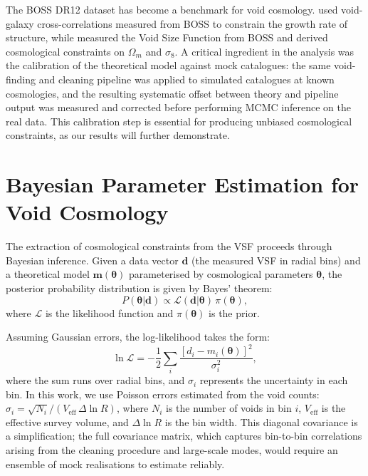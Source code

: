 \documentclass[12pt]{report}
\begin{document}
The BOSS DR12 dataset has become a benchmark for void cosmology. \citet{Hamaus2020} used void-galaxy cross-correlations measured from BOSS to constrain the growth rate of structure, while \citet{Contarini2023} measured the Void Size Function from BOSS and derived cosmological constraints on $\Omega_m$ and $\sigma_8$. A critical ingredient in the \citeauthor{Contarini2023} analysis was the calibration of the theoretical model against mock catalogues: the same void-finding and cleaning pipeline was applied to simulated catalogues at known cosmologies, and the resulting systematic offset between theory and pipeline output was measured and corrected before performing MCMC inference on the real data. This calibration step is essential for producing unbiased cosmological constraints, as our results will further demonstrate.


\section{Bayesian Parameter Estimation for Void Cosmology}
\label{sec:bayesian_background}

The extraction of cosmological constraints from the VSF proceeds through Bayesian inference. Given a data vector $\mathbf{d}$ (the measured VSF in radial bins) and a theoretical model $\mathbf{m}(\boldsymbol{\theta})$ parameterised by cosmological parameters $\boldsymbol{\theta}$, the posterior probability distribution is given by Bayes' theorem:
\begin{equation}
    P(\boldsymbol{\theta}|\mathbf{d}) \propto \mathcal{L}(\mathbf{d}|\boldsymbol{\theta})\,\pi(\boldsymbol{\theta})
    \label{eq:bayes},
\end{equation}
where $\mathcal{L}$ is the likelihood function and $\pi(\boldsymbol{\theta})$ is the prior.

Assuming Gaussian errors, the log-likelihood takes the form:
\begin{equation}
    \ln\mathcal{L} = -\frac{1}{2}\sum_i \frac{[d_i - m_i(\boldsymbol{\theta})]^2}{\sigma_i^2}
    \label{eq:gaussian_loglike},
\end{equation}
where the sum runs over radial bins, and $\sigma_i$ represents the uncertainty in each bin. In this work, we use Poisson errors estimated from the void counts: $\sigma_i = \sqrt{N_i}/(V_\mathrm{eff}\,\Delta\ln R)$, where $N_i$ is the number of voids in bin $i$, $V_\mathrm{eff}$ is the effective survey volume, and $\Delta\ln R$ is the bin width. This diagonal covariance is a simplification; the full covariance matrix, which captures bin-to-bin correlations arising from the cleaning procedure and large-scale modes, would require an ensemble of mock realisations to estimate reliably.
\end{document}
